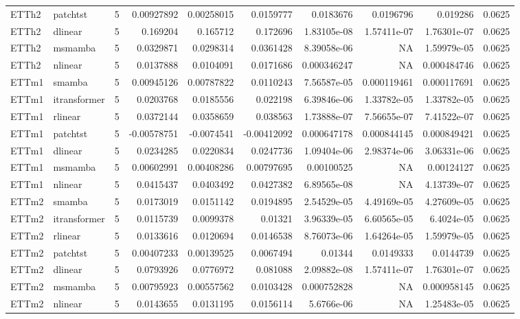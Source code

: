 \begin{longtable}{llrrrrrrrr}
ETTh2 & patchtst & 5 & 0.00927892 & 0.00258015 & 0.0159777 & 0.0183676 & 0.0196796 & 0.019286 & 0.0625 \\
ETTh2 & dlinear & 5 & 0.169204 & 0.165712 & 0.172696 & 1.83105e-08 & 1.57411e-07 & 1.76301e-07 & 0.0625 \\
ETTh2 & msmamba & 5 & 0.0329871 & 0.0298314 & 0.0361428 & 8.39058e-06 & NA & 1.59979e-05 & 0.0625 \\
ETTh2 & nlinear & 5 & 0.0137888 & 0.0104091 & 0.0171686 & 0.000346247 & NA & 0.000484746 & 0.0625 \\
ETTm1 & smamba & 5 & 0.00945126 & 0.00787822 & 0.0110243 & 7.56587e-05 & 0.000119461 & 0.000117691 & 0.0625 \\
ETTm1 & itransformer & 5 & 0.0203768 & 0.0185556 & 0.022198 & 6.39846e-06 & 1.33782e-05 & 1.33782e-05 & 0.0625 \\
ETTm1 & rlinear & 5 & 0.0372144 & 0.0358659 & 0.038563 & 1.73888e-07 & 7.56655e-07 & 7.41522e-07 & 0.0625 \\
ETTm1 & patchtst & 5 & -0.00578751 & -0.0074541 & -0.00412092 & 0.000647178 & 0.000844145 & 0.000849421 & 0.0625 \\
ETTm1 & dlinear & 5 & 0.0234285 & 0.0220834 & 0.0247736 & 1.09404e-06 & 2.98374e-06 & 3.06331e-06 & 0.0625 \\
ETTm1 & msmamba & 5 & 0.00602991 & 0.00408286 & 0.00797695 & 0.00100525 & NA & 0.00124127 & 0.0625 \\
ETTm1 & nlinear & 5 & 0.0415437 & 0.0403492 & 0.0427382 & 6.89565e-08 & NA & 4.13739e-07 & 0.0625 \\
ETTm2 & smamba & 5 & 0.0173019 & 0.0151142 & 0.0194895 & 2.54529e-05 & 4.49169e-05 & 4.27609e-05 & 0.0625 \\
ETTm2 & itransformer & 5 & 0.0115739 & 0.0099378 & 0.01321 & 3.96339e-05 & 6.60565e-05 & 6.4024e-05 & 0.0625 \\
ETTm2 & rlinear & 5 & 0.0133616 & 0.0120694 & 0.0146538 & 8.76073e-06 & 1.64264e-05 & 1.59979e-05 & 0.0625 \\
ETTm2 & patchtst & 5 & 0.00407233 & 0.00139525 & 0.0067494 & 0.01344 & 0.0149333 & 0.0144739 & 0.0625 \\
ETTm2 & dlinear & 5 & 0.0793926 & 0.0776972 & 0.081088 & 2.09882e-08 & 1.57411e-07 & 1.76301e-07 & 0.0625 \\
ETTm2 & msmamba & 5 & 0.00795923 & 0.00557562 & 0.0103428 & 0.000752828 & NA & 0.000958145 & 0.0625 \\
ETTm2 & nlinear & 5 & 0.0143655 & 0.0131195 & 0.0156114 & 5.6766e-06 & NA & 1.25483e-05 & 0.0625 \\

\end{longtable}
